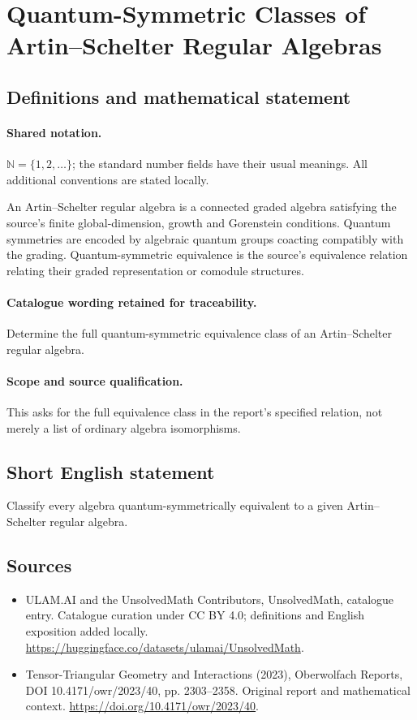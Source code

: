 \documentclass[11pt]{article}
\begin{document}
\section{Quantum-Symmetric Classes of Artin–Schelter Regular Algebras}\label{statement}

\subsection{Definitions and mathematical statement}

\paragraph{Shared notation.}$\mathbb N=\{1,2,\ldots\}$; the standard number fields have their usual meanings. All additional conventions are stated locally.


An Artin--Schelter regular algebra is a connected graded algebra satisfying the source's finite global-dimension, growth and Gorenstein conditions. Quantum symmetries are encoded by algebraic quantum groups coacting compatibly with the grading. Quantum-symmetric equivalence is the source's equivalence relation relating their graded representation or comodule structures.

\paragraph{Catalogue wording retained for traceability.}
Determine the full quantum-symmetric equivalence class of an Artin–Schelter regular algebra.

\paragraph{Scope and source qualification.}This asks for the full equivalence class in the report's specified relation, not merely a list of ordinary algebra isomorphisms.
\subsection{Short English statement}
Classify every algebra quantum-symmetrically equivalent to a given Artin--Schelter regular algebra.
\subsection{Sources}
\begin{itemize}
\item[\hypertarget{source:statement:1}{S1}] ULAM.AI and the UnsolvedMath Contributors, UnsolvedMath, catalogue entry. Catalogue curation under CC BY 4.0; definitions and English exposition added locally.
\url{https://huggingface.co/datasets/ulamai/UnsolvedMath}.
\item[\hypertarget{source:statement:2}{S2}] Tensor-Triangular Geometry and Interactions (2023), Oberwolfach Reports, DOI 10.4171/owr/2023/40, pp. 2303--2358. Original report and mathematical context.
\url{https://doi.org/10.4171/owr/2023/40}.
\end{itemize}
\label{end:statement}
\end{document}

